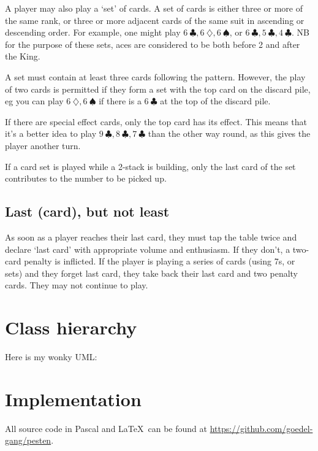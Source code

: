 \documentclass{article}
\begin{document}
    A player may also play a `set' of cards. A set of cards is either three or
    more of the same rank, or three or more adjacent cards of the same suit in
    ascending or descending order. For example, one might play
    $6\ \clubsuit, 6\ \diamondsuit, 6\ \spadesuit$, or
    $6\ \clubsuit, 5\ \clubsuit, 4\ \clubsuit$. NB for the purpose of these
    sets, aces are considered to be both before 2 and after the King.

    A set must contain at least three cards following the pattern. However, the
    play of two cards is permitted if they form a set with the top card on the
    discard pile, eg you can play $6\ \diamondsuit, 6\ \spadesuit$ if there is a 
    $6\ \clubsuit$ at the top of the discard pile.

    If there are special effect cards, only the top card has its effect. This
    means that it's a better idea to play
    $9\ \clubsuit, 8\ \clubsuit, 7\ \clubsuit$
    than the other way round, as this gives the player another turn.

    If a card set is played while a 2-stack is building, only the last card of
    the set contributes to the number to be picked up.

    \subsection{Last (card), but not least} \label{rule:lastcard}

    As soon as a player reaches their last card, they must tap the table twice
    and declare `last card' with appropriate volume and enthusiasm. If they
    don't, a two-card penalty is inflicted. If the player is playing a series
    of cards (using 7s, or sets) and they forget last card, they take back
    their last card and two penalty cards. They may not continue to play.

    \section{Class hierarchy}

    Here is my wonky UML:



    \section{Implementation}

    All source code in Pascal and \LaTeX\ can be found at
    \url{https://github.com/goedel-gang/pesten}.
\end{document}
